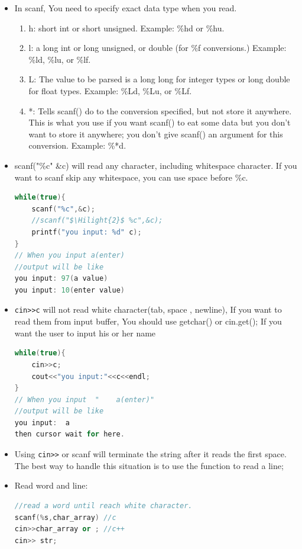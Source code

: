 \documentclass[a4paper,12pt,twoside]{book}
\newcommand{\Hilight}[1]{\makebox[0pt][l]{\color{yellow}\rule[-3pt]{#1em}{11pt}}}
\begin{document}
\begin{itemize}
	
	\item In scanf, You need to specify exact data type when you read.
	\begin{enumerate}
		\item h:  short int or short unsigned. Example: \%hd or \%hu.
		
		\item l:  a long int or long unsigned, or double (for \%f conversions.) Example: \%ld, \%lu, or \%lf.
		
		\item L: The value to be parsed is a long long for integer types or long double for float types. Example: \%Ld, \%Lu, or \%Lf.
		
		\item *: Tells scanf() do to the conversion specified, but not store it anywhere. This is what you use if you want scanf() to eat some data but you don't want to store it anywhere; you don't give scanf() an argument for this conversion. Example: \%*d.
	\end{enumerate}
	
	
	\item scanf("\%c" \&c) will read any character, including whitespace character. If you want to scanf skip any whitespace, you can use space before \%c.
	
\begin{lstlisting}[frame=single, language=c++, mathescape=true]
while(true){
	scanf("%c",&c);
	//scanf("$\Hilight{2}$ %c",&c);
	printf("you input: %d" c);
}
// When you input a(enter)
//output will be like
you input: 97(a value)
you input: 10(enter value)
\end{lstlisting}
	
	
	\item \verb=cin>>c= will not read white character(tab, space , newline), If you want to read them from input buffer, You should use getchar() or cin.get(); If you want the user to input his or her name
\begin{lstlisting}[frame=single, language=c++, mathescape=true]
while(true){
	cin>>c;
	cout<<"you input:"<<c<<endl;
}
// When you input  "    a(enter)"
//output will be like
you input:  a
then cursor wait for here.
\end{lstlisting}
	
	\item Using \verb=cin>>= or scanf will terminate the string after it reads the first space. The best way to handle this situation is to use the function to read a line;
	
	\item Read word and line:
\begin{lstlisting}[frame=single, language=c++]
//read a word until reach white character.
scanf(%s,char_array) //c
cin>>char_array or ; //c++
cin>> str;
	

\end{lstlisting}
\end{itemize}
\end{document}
